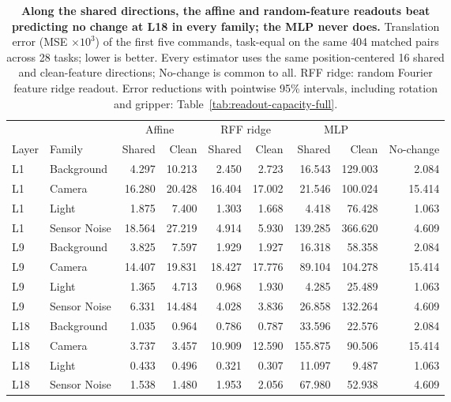 \begin{table}[t]
\caption{\textbf{Along the shared directions, the affine and random-feature readouts beat predicting no change at L18 in every family; the MLP never does.} Translation error (MSE $\times10^3$) of the first five commands, task-equal on the same 404 matched pairs across 28 tasks; lower is better. Every estimator uses the same position-centered 16 shared and clean-feature directions; No-change is common to all. RFF ridge: random Fourier feature ridge readout. Error reductions with pointwise 95\% intervals, including rotation and gripper: Table~\ref{tab:readout-capacity-full}.}
\centering\small
\setlength{\tabcolsep}{5pt}
\begin{tabular}{llrrrrrrr}\toprule
 & & \multicolumn{2}{c}{Affine} & \multicolumn{2}{c}{RFF ridge} & \multicolumn{2}{c}{MLP} & \\
Layer & Family & Shared & Clean & Shared & Clean & Shared & Clean & No-change\\\midrule
L1 & Background & 4.297 & 10.213 & 2.450 & 2.723 & 16.543 & 129.003 & 2.084\\
L1 & Camera & 16.280 & 20.428 & 16.404 & 17.002 & 21.546 & 100.024 & 15.414\\
L1 & Light & 1.875 & 7.400 & 1.303 & 1.668 & 4.418 & 76.428 & 1.063\\
L1 & Sensor Noise & 18.564 & 27.219 & 4.914 & 5.930 & 139.285 & 366.620 & 4.609\\
\midrule
L9 & Background & 3.825 & 7.597 & 1.929 & 1.927 & 16.318 & 58.358 & 2.084\\
L9 & Camera & 14.407 & 19.831 & 18.427 & 17.776 & 89.104 & 104.278 & 15.414\\
L9 & Light & 1.365 & 4.713 & 0.968 & 1.930 & 4.285 & 25.489 & 1.063\\
L9 & Sensor Noise & 6.331 & 14.484 & 4.028 & 3.836 & 26.858 & 132.264 & 4.609\\
\midrule
L18 & Background & 1.035 & 0.964 & 0.786 & 0.787 & 33.596 & 22.576 & 2.084\\
L18 & Camera & 3.737 & 3.457 & 10.909 & 12.590 & 155.875 & 90.506 & 15.414\\
L18 & Light & 0.433 & 0.496 & 0.321 & 0.307 & 11.097 & 9.487 & 1.063\\
L18 & Sensor Noise & 1.538 & 1.480 & 1.953 & 2.056 & 67.980 & 52.938 & 4.609\\
\bottomrule\end{tabular}

\label{tab:readout-capacity}
\end{table}
